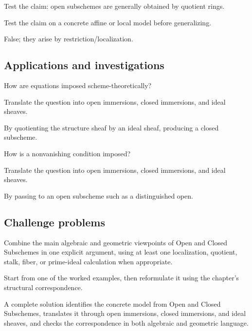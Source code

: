 \begin{exercise}\label{exr:vi22-expand-12}
Test the claim: open subschemes are generally obtained by quotient rings.
\end{exercise}
\begin{hint}
Test the claim on a concrete affine or local model before generalizing.
\end{hint}
\begin{solution}
False; they arise by restriction/localization.
\end{solution}

\subsection*{Applications and investigations}

\begin{exercise}[Equations]\label{exr:vi22-expand-13}
How are equations imposed scheme-theoretically?
\end{exercise}
\begin{hint}
Translate the question into open immersions, closed immersions, and ideal sheaves.
\end{hint}
\begin{solution}
By quotienting the structure sheaf by an ideal sheaf, producing a closed subscheme.
\end{solution}

\begin{exercise}\label{exr:vi22-expand-14}
How is a nonvanishing condition imposed?
\end{exercise}
\begin{hint}
Translate the question into open immersions, closed immersions, and ideal sheaves.
\end{hint}
\begin{solution}
By passing to an open subscheme such as a distinguished open.
\end{solution}

\subsection*{Challenge problems}

\begin{exercise}\label{exr:vi22-expand-15}
Combine the main algebraic and geometric viewpoints of Open and Closed Subschemes in one explicit argument, using at least one localization, quotient, stalk, fiber, or prime-ideal calculation when appropriate.
\end{exercise}
\begin{hint}
Start from one of the worked examples, then reformulate it using the chapter's structural correspondence.
\end{hint}
\begin{solution}
A complete solution identifies the concrete model from Open and Closed Subschemes, translates it through open immersions, closed immersions, and ideal sheaves, and checks the correspondence in both algebraic and geometric language.
\end{solution}

